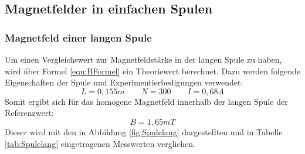 \documentclass[titlepage = firstcover]{scrartcl}
\begin{document}
        \subsection{Magnetfelder in einfachen Spulen}
            \subsubsection{Magnetfeld einer langen Spule}
                Um einen Vergleichswert zur Magnetfeldstärke in der langen Spule zu haben, wird über Formel \ref{eqn:BFormel} ein Theoriewert berechnet. Dazu werden folgende 
                Eigenschaften der Spule und Experimentierbedigungen verwendet:
                \begin{equation*}  
                    L = 0,155m \qquad N = 300 \qquad I = 0,68 A 
                \end{equation*}    
                Somit ergibt sich für das homogene Magnetfeld innerhalb der langen Spule der Referenzwert:
                \begin{equation}
                    B = 1,65 mT 
                    \label{eqn:BLang}
                \end{equation}
                Dieser wird mit den in Abbildung \ref{fig:Spulelang} dargestellten und in Tabelle \ref{tab:Spulelang} eingetragenen Messwerten verglichen.
    
\end{document}

